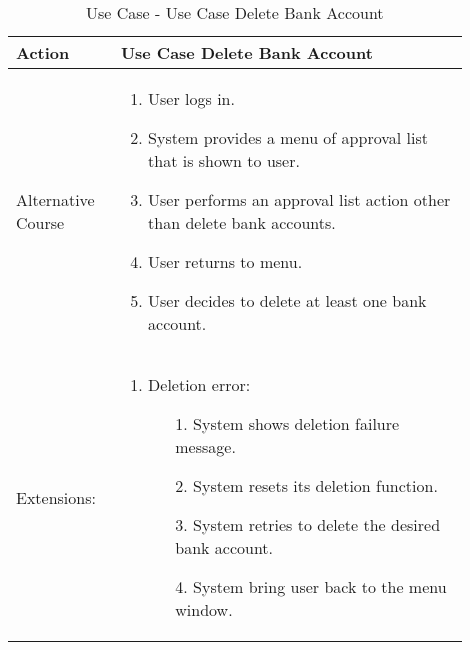 \documentclass{article}
\newcounter{use case ID}
\newcommand\tabularhead[1]{
\begin{table}[ht]
    \addtocounter{use case ID}{1}
    \caption{Use Case \arabic{use case ID} - #1}
    \vspace{0.2cm}
    \begin{tabular}{|p{0.2\linewidth}|p{0.70\linewidth}|}
    \hline
        \textbf{Action} & \textbf{#1} \\
        \hline}
\newcommand\addrow[2]{#1 & #2\\ \hline}
\newcommand\addmulrow[2]{ \begin{minipage}[t][][t]{2.5cm}#1\end{minipage}
        &\begin{minipage}[t][][t]{11cm}
        \begin{enumerate}[itemsep=-1ex] #2   \end{enumerate}
    \end{minipage}\vfill\\ \hline}
\newenvironment{usecase}{\tabularhead}
{\hline\end{tabular}\end{table}}
\begin{document}
\begin{usecase}{Use Case Delete Bank Account}
\addmulrow{Alternative Course}{
    \item User logs in.
    \item System provides a menu of approval list that is shown to user.
    \item User performs an approval list action other than delete bank accounts.
    \item User returns to menu.
    \item User decides to delete at least one bank account.
    
}

\addmulrow{Extensions:}{
	\item Deletion error:
		\begin{enumerate}
		\item[1.] System shows deletion failure message.
		\item[2.] System resets its deletion function.
		\item[3.] System retries to delete the desired bank account.
		\item[4.] System bring user back to the menu window.
		\end{enumerate}

}


\end{usecase}
\end{document}

